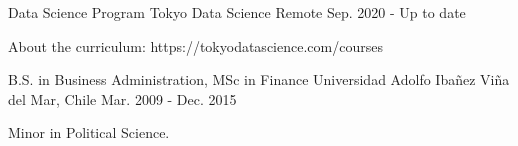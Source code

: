 

\begin{cventries}


  \cventry
    {Data Science Program} %
    {Tokyo Data Science} %
    {Remote} %
    {Sep. 2020 - Up to date} %
    {
      \begin{cvitems} %
        \item {About the curriculum: https://tokyodatascience.com/courses}
      \end{cvitems}
    }
    
  \cventry
    {B.S. in Business Administration, MSc in Finance} %
    {Universidad Adolfo Ibañez} %
    {Viña del Mar, Chile} %
    {Mar. 2009 - Dec. 2015} %
    {
      \begin{cvitems} %
        \item {Minor in Political Science.}
      \end{cvitems}
    }

\end{cventries}